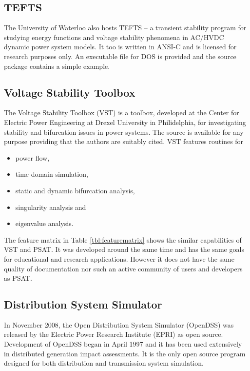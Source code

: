 \subsection{TEFTS}
The University of Waterloo also hosts TEFTS -- a transient stability program
for studying energy functions and voltage stability phenomena in AC/HVDC
dynamic power system models.  It too is written in ANSI-C and is licensed for
research purposes only.  An executable file for DOS is provided and the source
package contains a simple example.

\subsection{Voltage Stability Toolbox}
The Voltage Stability Toolbox (VST) is a \matlab toolbox, developed at the
Center for Electric Power Engineering at Drexel University in Philidelphia, for
investigating stability and bifurcation issues in power systems.  The source
is available for any purpose providing that the authors are suitably cited.
VST features routines for
\begin{itemize}
  \item power flow,
  \item time domain simulation,
  \item static and dynamic bifurcation analysis,
  \item singularity analysis and
  \item eigenvalue analysis.
\end{itemize}
The feature matrix in Table \ref{tbl:featurematrix} shows the similar
capabilities of VST and PSAT. It was developed around the same time and has
the same goals for educational and research applications.  However it does not
have the same quality of documentation nor such an active community of users
and developers as PSAT.

\subsection{Distribution System Simulator}
In November 2008, the Open Distribution System Simulator (OpenDSS) was released
by the Electric Power Research Institute (EPRI) as open source.  Development of
OpenDSS began in April 1997 and it has been used extensively in distributed
generation impact assessments.  It is the only open source
program designed for both distribution and transmission system simulation.

